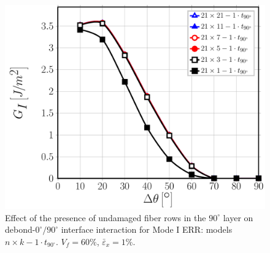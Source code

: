 \documentclass[Review,sagev,times]{sagej}
\begin{document}
\begin{figure}[!htb]
\centering
\includegraphics[height=0.375\textheight]{nxk-1-vf60-GI.pdf}
\caption{Effect of the presence of undamaged fiber rows in the $90^{\circ}$ layer on debond-$0^{\circ}/90^{\circ}$ interface interaction for Mode I ERR: models $n\times k-1\cdot t_{90^{\circ}}$. $V_{f}=60\%$, $\bar{\varepsilon}_{x}=1\%$.}\label{fig:nkGI}
\end{figure}
\end{document}
